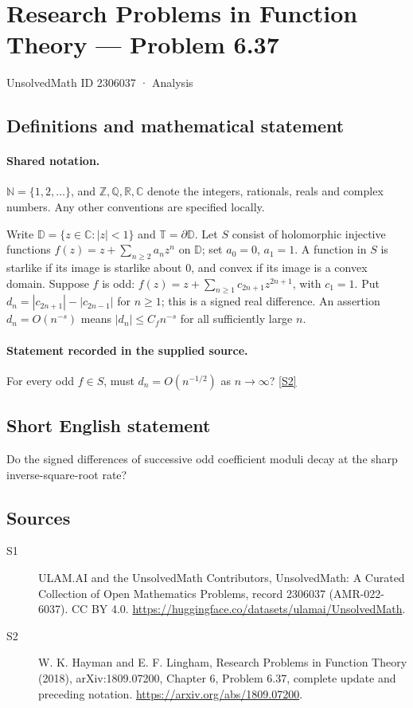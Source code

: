 \documentclass[11pt]{article}
\newcommand{\sref}[2]{\hyperlink{source:#1:#2}{[S#2]}}
\begin{document}
\setcounter{section}{2306036}
\section{Research Problems in Function Theory — Problem 6.37}\label{2306037}
{\small\sffamily UnsolvedMath ID 2306037 · Analysis}
\subsection{Definitions and mathematical statement}

\paragraph{Shared notation.}$\mathbb N=\{1,2,\ldots\}$, and $\mathbb Z,\mathbb Q,\mathbb R,\mathbb C$ denote the integers, rationals, reals and complex numbers. Any other conventions are specified locally.


Write $\mathbb D=\{z\in\mathbb C:|z|<1\}$ and $\mathbb T=\partial\mathbb D$. Let $S$ consist of holomorphic injective functions $f(z)=z+\sum_{n\ge2}a_nz^n$ on $\mathbb D$; set $a_0=0$, $a_1=1$. A function in $S$ is starlike if its image is starlike about $0$, and convex if its image is a convex domain. Suppose $f$ is odd: $f(z)=z+\sum_{n\ge1}c_{2n+1}z^{2n+1}$, with $c_1=1$. Put $d_n=|c_{2n+1}|-|c_{2n-1}|$ for $n\ge1$; this is a signed real difference. An assertion $d_n=O(n^{-s})$ means $|d_n|\le C_f n^{-s}$ for all sufficiently large $n$.
\paragraph{Statement recorded in the supplied source.}
For every odd $f\in S$, must $d_n=O(n^{-1/2})$ as $n\to\infty$? \sref{2306037}{2}
\subsection{Short English statement}
Do the signed differences of successive odd coefficient moduli decay at the sharp inverse-square-root rate?
\subsection{Sources}
\begin{description}
\item[\hypertarget{source:2306037:1}{S1}] ULAM.AI and the UnsolvedMath Contributors, UnsolvedMath: A Curated Collection of Open Mathematics Problems, record 2306037 (AMR-022-6037). CC BY 4.0. \url{https://huggingface.co/datasets/ulamai/UnsolvedMath}.
\item[\hypertarget{source:2306037:2}{S2}] W. K. Hayman and E. F. Lingham, Research Problems in Function Theory (2018), arXiv:1809.07200, Chapter 6, Problem 6.37, complete update and preceding notation. \url{https://arxiv.org/abs/1809.07200}.
\end{description}
\label{end:2306037}
\end{document}
